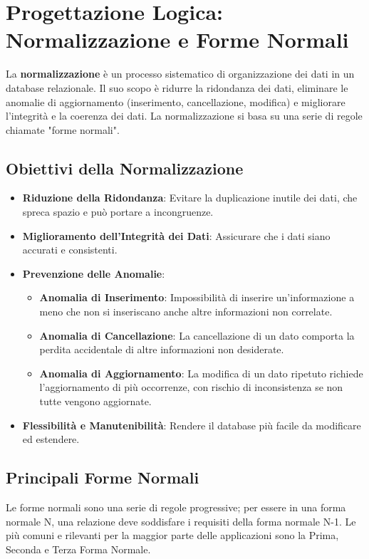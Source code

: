\section{Progettazione Logica: Normalizzazione e Forme Normali}
La \textbf{normalizzazione} è un processo sistematico di organizzazione dei dati in un database relazionale. Il suo scopo è ridurre la ridondanza dei dati, eliminare le anomalie di aggiornamento (inserimento, cancellazione, modifica) e migliorare l'integrità e la coerenza dei dati. La normalizzazione si basa su una serie di regole chiamate "forme normali".

\subsection{Obiettivi della Normalizzazione}
\begin{itemize}
    \item \textbf{Riduzione della Ridondanza}: Evitare la duplicazione inutile dei dati, che spreca spazio e può portare a incongruenze.
    \item \textbf{Miglioramento dell'Integrità dei Dati}: Assicurare che i dati siano accurati e consistenti.
    \item \textbf{Prevenzione delle Anomalie}:
    \begin{itemize}
        \item \textbf{Anomalia di Inserimento}: Impossibilità di inserire un'informazione a meno che non si inseriscano anche altre informazioni non correlate.
        \item \textbf{Anomalia di Cancellazione}: La cancellazione di un dato comporta la perdita accidentale di altre informazioni non desiderate.
        \item \textbf{Anomalia di Aggiornamento}: La modifica di un dato ripetuto richiede l'aggiornamento di più occorrenze, con rischio di inconsistenza se non tutte vengono aggiornate.
    \end{itemize}
    \item \textbf{Flessibilità e Manutenibilità}: Rendere il database più facile da modificare ed estendere.
\end{itemize}

\subsection{Principali Forme Normali}
Le forme normali sono una serie di regole progressive; per essere in una forma normale N, una relazione deve soddisfare i requisiti della forma normale N-1. Le più comuni e rilevanti per la maggior parte delle applicazioni sono la Prima, Seconda e Terza Forma Normale.

